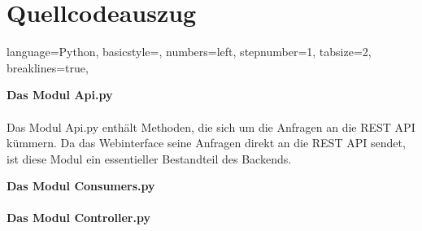 \section{Quellcodeauszug}
\lstset
{
    language=Python,
    basicstyle=\footnotesize,
    numbers=left,
    stepnumber=1,
    tabsize=2,
    breaklines=true,
}

\textbf{Das Modul Api.py}\\\\
Das Modul Api.py enthält Methoden, die sich um die Anfragen an die REST API kümmern. 
Da das Webinterface seine Anfragen direkt an die REST API sendet, ist diese Modul ein essentieller
Bestandteil des Backends.


\newpage
\textbf{Das Modul Consumers.py}\\\\



\newpage
\textbf{Das Modul Controller.py}\\\\

